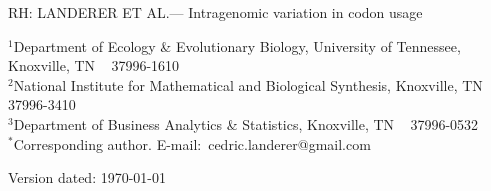 \documentclass[12pt, letter]{article}
\begin{document}
\doublespacing
\linenumbers

\newcommand{\kluyveri}{\textit{L. kluyveri}\xspace}
\newcommand{\dubl}{\textit{C. dubliniensis}\xspace}
\newcommand{\gossypii}{\textit{E. gossypii}\xspace}

\newcommand{\GC}{GC content\xspace}
\newcommand{\ROC}{ROC SEMPPR\xspace}



\noindent RH: LANDERER ET AL.--- Intragenomic variation in codon usage
\bigskip
\medskip
\begin{center}

\bigskip





\end{center}

\vfill

{\small
\noindent$^{1}$Department of Ecology \& Evolutionary Biology, University of Tennessee, Knoxville, TN ~ 37996-1610\\
\noindent$^{2}$National Institute for Mathematical and Biological Synthesis, Knoxville, TN ~ 37996-3410\\
\noindent$^{3}$Department of Business Analytics \& Statistics, Knoxville, TN ~ 37996-0532 \\
\noindent$^{*}$Corresponding author. E-mail:~cedric.landerer@gmail.com
}

\vfill
\centerline{Version dated: \today}
\vfill
\newpage
\end{document}
